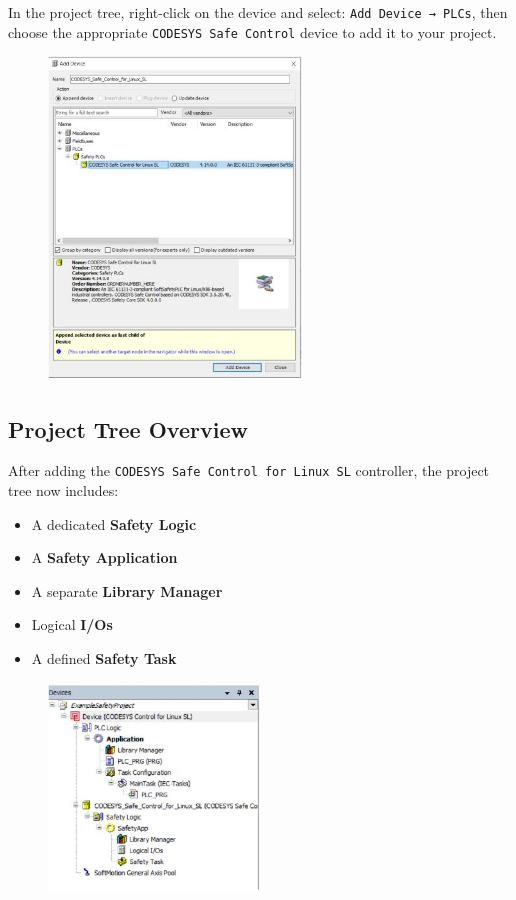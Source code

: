 \documentclass[a4paper,12pt]{article}
\begin{document}
In the project tree, right-click on the device and select:  
\texttt{Add Device → PLCs},  
then choose the appropriate \texttt{CODESYS Safe Control} device to add it to your project.

\begin{figure}[H]
	\centering
	\includegraphics[width=0.6\textwidth]{11.JPG}
\end{figure}

\subsection{Project Tree Overview}
After adding the \texttt{CODESYS Safe Control for Linux SL} controller, the project tree now includes:

\begin{itemize}
	\item A dedicated \textbf{Safety Logic}
	\item A \textbf{Safety Application}
	\item A separate \textbf{Library Manager}
	\item Logical \textbf{I/Os}
	\item A defined \textbf{Safety Task}
\end{itemize}

\begin{figure}[H]
	\centering
	\includegraphics[width=0.5\textwidth]{12.JPG}
\end{figure}
\end{document}
